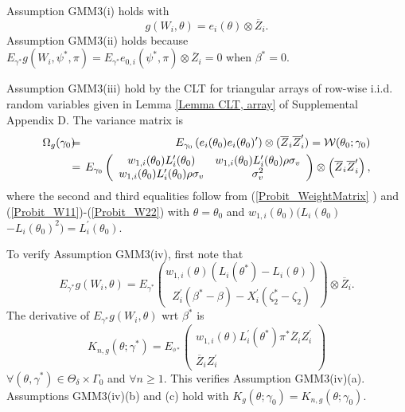 \documentclass[12pt,thmsb,titlepage,final,oneside,letterpaper]{article}
\begin{document}
\hspace{0.25in}Assumption GMM3(i) holds with 
\begin{equation}
g(W_{i},\theta )=e_{i}(\theta )\otimes \overline{Z}_{i}.
\end{equation}%
Assumption GMM3(ii) holds because $E_{\gamma ^{\ast }}g(W_{i},\psi ^{\ast
},\pi )=E_{\gamma ^{\ast }}e_{0,i}(\psi ^{\ast },\pi )\otimes \overline{Z}%
_{i}=0$ when $\beta ^{\ast }=0.$

Assumption GMM3(iii) hold by the CLT for triangular arrays of row-wise
i.i.d. random variables given in Lemma \ref{Lemma CLT, array} of
Supplemental Appendix D. The variance matrix is%
\begin{eqnarray}
\Omega _{g}(\gamma _{0})\hspace{-0.08in} &=&\hspace{-0.08in}E_{\gamma
_{0}}\left( e_{i}(\theta _{0})e_{i}(\theta _{0})^{\prime }\right) \otimes (%
\overline{Z}_{i}\overline{Z}_{i}^{\prime })=\mathcal{W}(\theta _{0};\gamma
_{0})  \notag \\
&=&\hspace{-0.08in}E_{\gamma _{0}}\left( 
\begin{array}{cc}
w_{1,i}(\theta _{0})L_{i}^{\prime }(\theta _{0}) & w_{1,i}(\theta
_{0})L_{i}^{\prime }(\theta _{0})\rho \sigma _{v} \\ 
w_{1,i}(\theta _{0})L_{i}^{\prime }(\theta _{0})\rho \sigma _{v} & \sigma
_{v}^{2}%
\end{array}%
\right) \otimes \left( \overline{Z}_{i}\overline{Z}_{i}^{\prime }\right) ,
\label{Probit_Omega}
\end{eqnarray}%
where the second and third equalities follow from (\ref{Probit_WeightMatrix}%
) and (\ref{Probit_W11})-(\ref{Probit_W22}) with $\theta =\theta _{0}$ and $%
w_{1,i}(\theta _{0})(L_{i}(\theta _{0})$\allowbreak $-L_{i}(\theta
_{0})^{2})\allowbreak =L_{i}^{\prime }(\theta _{0}).$

To verify Assumption GMM3(iv), first note that%
\begin{equation}
E_{\gamma ^{\ast }}g(W_{i},\theta )=E_{\gamma ^{\ast }}\binom{w_{1,i}(\theta
)(L_{i}(\theta ^{\ast })-L_{i}(\theta ))}{Z_{i}^{\prime }(\beta ^{\ast
}-\beta )-X_{i}^{\prime }(\zeta _{2}^{\ast }-\zeta _{2})}\otimes \overline{Z}%
_{i}.  \label{Expected g}
\end{equation}%
The derivative of $E_{\gamma ^{\ast }}g(W_{i},\theta )$ wrt $\beta ^{\ast }$
is%
\begin{equation}
K_{n,g}(\theta ;\gamma ^{\ast })=E_{^{\phi \ast }}\left( 
\begin{array}{c}
w_{1,i}(\theta )L_{i}^{\prime }(\theta ^{\ast })\pi ^{\ast }\overline{Z}%
_{i}Z_{i}^{\prime } \\ 
\overline{Z}_{i}Z_{i}^{\prime }%
\end{array}%
\right)  \label{Probit Kg}
\end{equation}%
$\forall (\theta ,\gamma ^{\ast })\in \Theta _{\delta }\times \Gamma _{0}$
and $\forall n\geq 1.$ This verifies Assumption GMM3(iv)(a). Assumptions
GMM3(iv)(b) and (c) hold with $K_{g}(\theta ;\gamma _{0})=K_{n,g}(\theta
;\gamma _{0}).$
\end{document}

